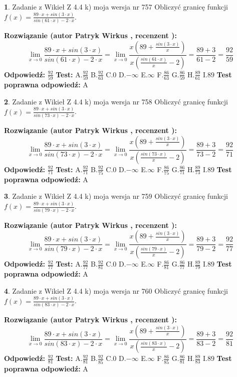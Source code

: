 \documentclass[12pt, a4paper]{article}
\theoremstyle{definition} %
\newtheorem{zad}{}
\newcommand{\zadStart}[1]{\begin{zad}#1\newline}
\newcommand{\zadStop}{\end{zad}}
\newcommand{\rozwStart}[2]{\noindent \textbf{Rozwiązanie (autor #1 , recenzent #2): }\newline}
\newcommand{\rozwStop}{\newline}
\newcommand{\odpStart}{\noindent \textbf{Odpowiedź:}\newline}
\newcommand{\odpStop}{\newline}
\newcommand{\testStart}{\noindent \textbf{Test:}\newline}
\newcommand{\testStop}{\newline}
\newcommand{\kluczStart}{\noindent \textbf{Test poprawna odpowiedź:}\newline}
\newcommand{\kluczStop}{\newline}
\begin{document}
\zadStart{Zadanie z Wikieł Z 4.4 k) moja wersja nr 757}
Obliczyć granicę funkcji $f(x)=\frac{89\cdot x +sin(3\cdot x)}{sin(61\cdot x) -2\cdot x}$.
\zadStop
\rozwStart{Patryk Wirkus}{}
$$\lim\limits_{x\to 0}\frac{89\cdot x +sin(3\cdot x)}{sin(61\cdot x) -2\cdot x}
=\lim\limits_{x\to 0}\frac{x(89+\frac{sin(3\cdot x)}{x})}{x(\frac{sin(61\cdot x)}{x}-2)}
=\frac{89+3}{61-2} = \frac{92}{59}$$
\rozwStop
\odpStart
$\frac{92}{59}$
\odpStop
\testStart
A.$\frac{92}{59}$
B.$\frac{92}{63}$
C.$0$
D.$-\infty$
E.$\infty$
F.$\frac{86}{63}$
G.$\frac{86}{59}$
H.$\frac{89}{61}$
I.$89$
\testStop
\kluczStart
A
\kluczStop



\zadStart{Zadanie z Wikieł Z 4.4 k) moja wersja nr 758}
Obliczyć granicę funkcji $f(x)=\frac{89\cdot x +sin(3\cdot x)}{sin(73\cdot x) -2\cdot x}$.
\zadStop
\rozwStart{Patryk Wirkus}{}
$$\lim\limits_{x\to 0}\frac{89\cdot x +sin(3\cdot x)}{sin(73\cdot x) -2\cdot x}
=\lim\limits_{x\to 0}\frac{x(89+\frac{sin(3\cdot x)}{x})}{x(\frac{sin(73\cdot x)}{x}-2)}
=\frac{89+3}{73-2} = \frac{92}{71}$$
\rozwStop
\odpStart
$\frac{92}{71}$
\odpStop
\testStart
A.$\frac{92}{71}$
B.$\frac{92}{75}$
C.$0$
D.$-\infty$
E.$\infty$
F.$\frac{86}{75}$
G.$\frac{86}{71}$
H.$\frac{89}{73}$
I.$89$
\testStop
\kluczStart
A
\kluczStop



\zadStart{Zadanie z Wikieł Z 4.4 k) moja wersja nr 759}
Obliczyć granicę funkcji $f(x)=\frac{89\cdot x +sin(3\cdot x)}{sin(79\cdot x) -2\cdot x}$.
\zadStop
\rozwStart{Patryk Wirkus}{}
$$\lim\limits_{x\to 0}\frac{89\cdot x +sin(3\cdot x)}{sin(79\cdot x) -2\cdot x}
=\lim\limits_{x\to 0}\frac{x(89+\frac{sin(3\cdot x)}{x})}{x(\frac{sin(79\cdot x)}{x}-2)}
=\frac{89+3}{79-2} = \frac{92}{77}$$
\rozwStop
\odpStart
$\frac{92}{77}$
\odpStop
\testStart
A.$\frac{92}{77}$
B.$\frac{92}{81}$
C.$0$
D.$-\infty$
E.$\infty$
F.$\frac{86}{81}$
G.$\frac{86}{77}$
H.$\frac{89}{79}$
I.$89$
\testStop
\kluczStart
A
\kluczStop



\zadStart{Zadanie z Wikieł Z 4.4 k) moja wersja nr 760}
Obliczyć granicę funkcji $f(x)=\frac{89\cdot x +sin(3\cdot x)}{sin(83\cdot x) -2\cdot x}$.
\zadStop
\rozwStart{Patryk Wirkus}{}
$$\lim\limits_{x\to 0}\frac{89\cdot x +sin(3\cdot x)}{sin(83\cdot x) -2\cdot x}
=\lim\limits_{x\to 0}\frac{x(89+\frac{sin(3\cdot x)}{x})}{x(\frac{sin(83\cdot x)}{x}-2)}
=\frac{89+3}{83-2} = \frac{92}{81}$$
\rozwStop
\odpStart
$\frac{92}{81}$
\odpStop
\testStart
A.$\frac{92}{81}$
B.$\frac{92}{85}$
C.$0$
D.$-\infty$
E.$\infty$
F.$\frac{86}{85}$
G.$\frac{86}{81}$
H.$\frac{89}{83}$
I.$89$
\testStop
\kluczStart
A
\kluczStop
\end{document}

